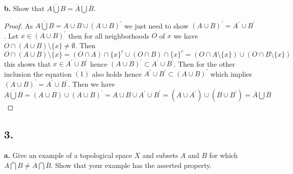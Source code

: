 \documentclass{amsart}
\theoremstyle{plain}
\theoremstyle{definition}
\theoremstyle{remark}
\begin{document}
\vspace{.1in}
{\bfseries b.} Show that $\overline{A\bigcup B} = \overline{A} \bigcup \overline{B}$. 

\begin{proof}
    As $\overline{ A\bigcup B}= A\cup B \cup (A\cup B)^\prime$ we just need to show $(A\cup B)^\prime = A^\prime \cup B^\prime$. Let $x\in (A\cup B)^\prime$ then for all neighborhoods $O$ of $x$ we have $O\cap (A\cup B)\setminus \{x\}\not = \emptyset$. Then \begin{equation}O\cap (A\cup B)\setminus \{x\}=(O\cap A)\cap \{x\}^c\cup (O\cap B)\cap \{x\}^c = (O\cap A\setminus \{x\})\cup (O\cap B\setminus \{x\})\end{equation} this shows that $x\in A^\prime \cup B^\prime$ hence $(A\cup B)^\prime \subset A^\prime \cup B^\prime $. Then for the other inclusion the equation $(1)$ also holds hence $A^\prime \cup B^\prime \subset (A\cup B)^\prime$ which implies $(A\cup B)^\prime=A^\prime \cup B^\prime$. Then we have $\overline{ A\bigcup B}=(A\cup B) \cup (A\cup B)^\prime=A \cup B \cup A^\prime \cup B^\prime= (A\cup A^\prime) \cup (B\cup B^\prime)=\overline{A} \bigcup \overline B$
\end{proof}


\vspace{.15in}

\noindent
\subsection*{3.} 

\vspace{.1in}
{\bfseries a.} Give an example of a topological space $X$ and subsets $A$ and $B$ for which $\overline{A\bigcap B} \ne \overline{A} \bigcap \overline{B}$. Show that your example has the asserted property. 
\end{document}
